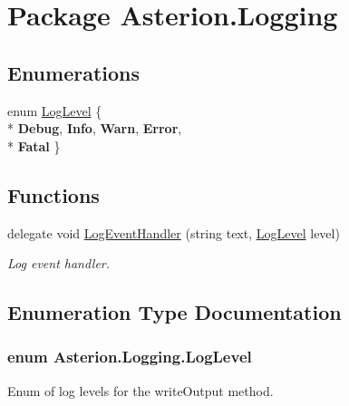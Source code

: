 \hypertarget{namespaceAsterion_1_1Logging}{\section{Package Asterion.\-Logging}
\label{namespaceAsterion_1_1Logging}
}
\subsection*{Enumerations}
\begin{DoxyCompactItemize}
\item 
enum \hyperlink{namespaceAsterion_1_1Logging_afaaa8cc38da45118ed4f5c2064c2a28c}{Log\-Level} \{ \\*
{\bfseries Debug}, 
{\bfseries Info}, 
{\bfseries Warn}, 
{\bfseries Error}, 
\\*
{\bfseries Fatal}
 \}
\end{DoxyCompactItemize}
\subsection*{Functions}
\begin{DoxyCompactItemize}
\item 
\hypertarget{namespaceAsterion_1_1Logging_afaa8d5b6776c6635522846d7f2751ca9}{delegate void \hyperlink{namespaceAsterion_1_1Logging_afaa8d5b6776c6635522846d7f2751ca9}{Log\-Event\-Handler} (string text, \hyperlink{namespaceAsterion_1_1Logging_afaaa8cc38da45118ed4f5c2064c2a28c}{Log\-Level} level)}\label{namespaceAsterion_1_1Logging_afaa8d5b6776c6635522846d7f2751ca9}

\begin{DoxyCompactList}\small\item\em Log event handler. \end{DoxyCompactList}\end{DoxyCompactItemize}


\subsection{Enumeration Type Documentation}
\hypertarget{namespaceAsterion_1_1Logging_afaaa8cc38da45118ed4f5c2064c2a28c}{
\subsubsection[{Log\-Level}]{\setlength{\rightskip}{0pt plus 5cm}enum {\bf Asterion.\-Logging.\-Log\-Level}}}\label{namespaceAsterion_1_1Logging_afaaa8cc38da45118ed4f5c2064c2a28c}
Enum of log levels for the write\-Output method. 